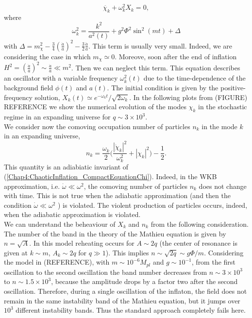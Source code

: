 \documentclass[11pt,a4paper,twoside]{book}
\begin{document}
\begin{equation}
	\label{Chap4:ChaoticInflation_CompactEquationChi}
	\ddot{\chi_{k}} + \omega_{k}^{2}X_{k} = 0,
\end{equation}
where 
\begin{equation}
	\label{Chap4:ChaoticInflation_Omega_k}
	\omega_{k}^{2}=\frac{k^{2}}{a^{2}(t)} + g^{2}\Phi^{2}\sin^{2}(mt) + \Delta
\end{equation}
with $ \Delta=m_{\chi}^{2}-\frac{3}{4}(\frac{\dot{a}}{a})^{2}-\frac{3}{2}\frac{\ddot{a}}{a} $. This term is usually very small. Indeed, we are considering the case in which $ m_{\chi}\simeq 0 $. Moreove,  soon after the end of inflation $ H^{2}=(\frac{\dot{a}}{a})^{2}\sim \frac{\dot{a}}{a} \ll m^{2} $. Then we can neglect this term. This equation describes an oscillator with a variable frequency $ \omega_{k}^{2}(t) $ due to the time-dependence of the background field $\phi(t)$ and $ a(t) $. The initial condition is given by the positive-frequency solution, $ X_{k}(t) \simeq e^{-\omega_{k}t}/\sqrt{2\omega_{k}} $. In the following plots from (FIGURE) REFERENCE we show the numerical evolution of the modes $ \chi_{k} $ in the stochastic regime in an expanding universe for $ q \sim 3 \times 10^{3} $.\\
We consider now the comoving occupation number of particles $ n_{k} $ in the mode $ k $ in an expanding universe,
\begin{equation}
	\label{Chap4:comovNumberParticles}
	n_{k}=\frac{\omega_{k}}{2}\Bigg(\frac{|\dot{\chi}_{k}|^{2}}{\omega^{2}_{k}} + |\chi_{k}|^{2}\Bigg) - \frac{1}{2}.
\end{equation}
This quantity is an adiabiatic invariant of (\ref{Chap4:ChaoticInflation_CompactEquationChi}). Indeed, in the WKB approximation, i.e. $\dot{\omega} \ll \omega^{2}$, the comoving number of particles $ n_{k} $ does not change with time. This is not true when the adiabatic approximation (and then the condition $\dot{\omega} \ll \omega^{2}$ ) is violated. The violent production of particles occurs, indeed, when the adiabatic approximation is violated.\\
We can understand the beheaviour of $ X_{k} $ and $ n_{k} $ from the following consideration. The number of the band in the theory of the Mathieu equation is given by $ n=\sqrt{A} $. In this model reheating occurs for $ A\sim 2q $ (the center of resonance is given at $ k\sim m $, $ A_{k} \sim 2q $ for $ q \gg 1 $). This implies $ n\sim\sqrt{2q}\sim g\Phi/m $. Considering the model in (REFERENCE), with $ m\sim 10^{-6} M_{pl} $ and $ g\sim 10^{-1} $, from the first oscillation to the second oscillation the band number decreases from $ n \sim 3 \times 10^{3} $ to $ n\sim 1.5 \times 10^{3} $, because the amplitude drops by a factor two after the second oscillation. Therefore, during a single oscillation of the inflaton, the field does not remain in the same instability band of the Mathieu equation, but it jumps over $ 10^{3} $ different instability bands. Thus the standard approach completely fails here.\\
\end{document}

